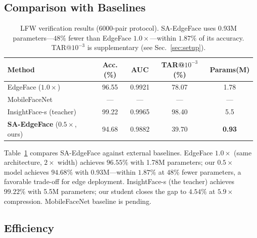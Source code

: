 \documentclass[journal,10pt]{IEEEtran}
\begin{document}
\subsection{Comparison with Baselines}
\label{sec:comparison}

\begin{table}[h]
\centering
\caption{LFW verification results (6000-pair protocol). SA-EdgeFace uses 0.93M parameters---$48\%$ fewer than EdgeFace $1.0{\times}$---within $1.87\%$ of its accuracy. TAR@$10^{-3}$ is supplementary (see Sec.~\ref{sec:setup}).}
\label{tab:comparison}
\begin{tabular}{lcccc}
\toprule
Method & Acc.(\%) & AUC & TAR@$10^{-3}$(\%) & Params(M) \\
\midrule
EdgeFace ($1.0{\times}$)       & 96.55 & 0.9921 & 78.07 & 1.78 \\
MobileFaceNet                 & --- & --- & --- & --- \\
InsightFace-s (teacher)       & 99.22 & 0.9965 & 98.40 & 5.5 \\
\midrule
\textbf{SA-EdgeFace} ($0.5{\times}$, ours) & 94.68 & 0.9882 & 39.70 & \textbf{0.93} \\
\bottomrule
\end{tabular}
\end{table}

Table~\ref{tab:comparison} compares SA-EdgeFace against external baselines. EdgeFace $1.0{\times}$ (same architecture, $2{\times}$ width) achieves $96.55\%$ with 1.78M parameters; our $0.5{\times}$ model achieves $94.68\%$ with 0.93M---within $1.87\%$ at $48\%$ fewer parameters, a favorable trade-off for edge deployment. InsightFace-s (the teacher) achieves $99.22\%$ with 5.5M parameters; our student closes the gap to $4.54\%$ at $5.9{\times}$ compression. MobileFaceNet baseline is pending.

\subsection{Efficiency}
\label{sec:efficiency}
\end{document}
